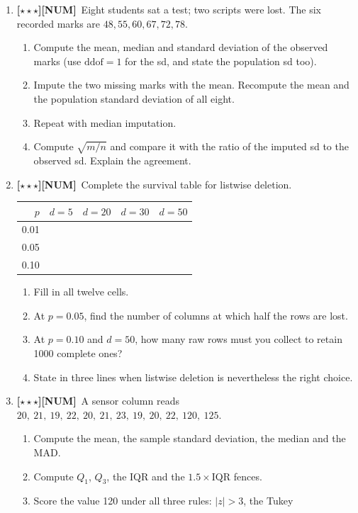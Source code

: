 \documentclass[11pt,a4paper]{article}
\newcommand{\LA}{{\footnotesize\textbf{[$\star\star\star$]}}}
\newcommand{\NUM}{{\footnotesize\textbf{[NUM]}}}
\newcommand{\Q}[1]{\item[\textbf{#1}]}
\begin{document}
\begin{enumerate}[leftmargin=2.2cm]
\Q{U4.54}\LA\NUM\ Eight students sat a test; two scripts were lost. The six
  recorded marks are $48, 55, 60, 67, 72, 78$.
  \begin{enumerate}[label=(\alph*)]
    \item Compute the mean, median and standard deviation of the observed
      marks (use $\text{ddof}=1$ for the sd, and state the population sd too).
    \item Impute the two missing marks with the mean. Recompute the mean and
      the population standard deviation of all eight.
    \item Repeat with median imputation.
    \item Compute $\sqrt{m/n}$ and compare it with the ratio of the imputed sd
      to the observed sd. Explain the agreement.
  \end{enumerate}
\Q{U4.55}\LA\NUM\ Complete the survival table for listwise deletion.
  \begin{center}\begin{tabular}{@{}rrrrr@{}}\toprule
  $p$ & $d=5$ & $d=20$ & $d=30$ & $d=50$\\
  \midrule
  0.01 & & & & \\ 0.05 & & & & \\ 0.10 & & & & \\
  \bottomrule\end{tabular}\end{center}
  \begin{enumerate}[label=(\alph*)]
    \item Fill in all twelve cells.
    \item At $p = 0.05$, find the number of columns at which half the rows are
      lost.
    \item At $p = 0.10$ and $d = 50$, how many raw rows must you collect to
      retain 1000 complete ones?
    \item State in three lines when listwise deletion is nevertheless the right
      choice.
  \end{enumerate}
\Q{U4.56}\LA\NUM\ A sensor column reads
  $20,\ 21,\ 19,\ 22,\ 20,\ 21,\ 23,\ 19,\ 20,\ 22,\ 120,\ 125$.
  \begin{enumerate}[label=(\alph*)]
    \item Compute the mean, the sample standard deviation, the median and the
      MAD.
    \item Compute $Q_1$, $Q_3$, the IQR and the $1.5\times$IQR fences.
    \item Score the value 120 under all three rules: $|z| > 3$, the Tukey

\end{enumerate}
\end{enumerate}
\end{document}
